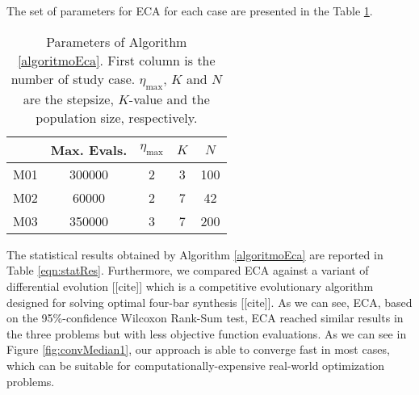\documentclass[12pt,letterpape]{article}
\begin{document}
The set of parameters for ECA for each case are presented in the Table \ref{tab:parms}.


\begin{table}[!ht]
	\centering
	\begin{tabular}{ccccc}
		    & Max. Evals. & $\eta_{\max}$ & $K$ & $N$ \\ \hline
		M01 &   300000    &     2         &  3  & 100 \\
		M02 &    60000    &     2         &  7  & 42 \\
		M03 &   350000    &     3         &  7  & 200 \\
	\end{tabular}
	\caption{Parameters of Algorithm \ref{algoritmoEca}. First column is the number
	of study case. $\eta_{\max}$, $K$ and $N$ are the stepsize, $K$-value and the population size, respectively.}
	\label{tab:parms}
\end{table}

The statistical results obtained by Algorithm \ref{algoritmoEca} are reported in
Table \ref{eqn:statRes}. Furthermore, we compared ECA against a variant of differential
evolution [[cite]] which is a competitive evolutionary algorithm designed for solving
optimal four-bar synthesis [[cite]]. As we can see, ECA, based on the 95\%-confidence
Wilcoxon Rank-Sum test, ECA reached similar results in the three problems but with
less objective function evaluations. As we can see in Figure \ref{fig:convMedian1},
our approach is able to converge fast in most cases, which can be suitable for computationally-expensive real-world optimization problems.
\end{document}
